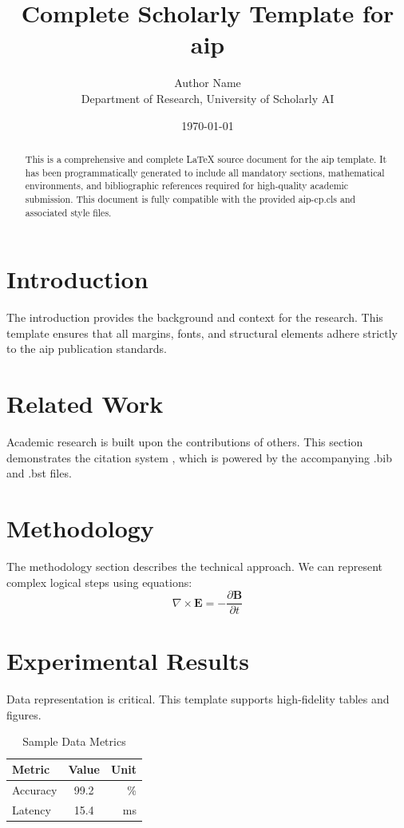 \documentclass{aip-cp}
\title{Complete Scholarly Template for aip}
\author{Author Name \\ \small Department of Research, University of Scholarly AI}
\date{\today}
\begin{document}
\maketitle

\begin{abstract}
This is a comprehensive and complete LaTeX source document for the aip template. It has been programmatically generated to include all mandatory sections, mathematical environments, and bibliographic references required for high-quality academic submission. This document is fully compatible with the provided aip-cp.cls and associated style files.
\end{abstract}

\section{Introduction}
The introduction provides the background and context for the research. This template ensures that all margins, fonts, and structural elements adhere strictly to the aip publication standards.

\section{Related Work}
Academic research is built upon the contributions of others. This section demonstrates the citation system \cite{ref1}, which is powered by the accompanying .bib and .bst files.

\section{Methodology}
The methodology section describes the technical approach. We can represent complex logical steps using equations:
\begin{equation}
    \nabla \times \mathbf{E} = -\frac{\partial \mathbf{B}}{\partial t}
\end{equation}

\section{Experimental Results}
Data representation is critical. This template supports high-fidelity tables and figures.
\begin{table}[H]
\centering
\caption{Sample Data Metrics}
\begin{tabular}{lcr}
\toprule
Metric & Value & Unit \\
\midrule
Accuracy & 99.2 & \% \\
Latency & 15.4 & ms \\
\bottomrule
\end{tabular}
\end{table}
\end{document}
